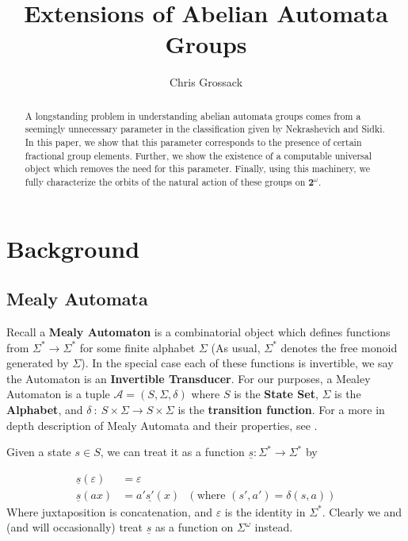 \documentclass[12pt]{article}
\title{Extensions of Abelian Automata Groups}
\author{Chris Grossack}
\newcommand{\A}{\mathcal{A}}
\newcommand{\2}{\textbf{2}}
\begin{document}
\maketitle

\begin{abstract}
  A longstanding problem in understanding abelian automata groups
  comes from a seemingly unnecessary parameter in the classification
  given by Nekrashevich and Sidki. In this paper, we show that
  this parameter corresponds to the presence of certain fractional group
  elements. Further, we show the existence of a computable universal object 
  which removes the need for this parameter. Finally, using this machinery, 
  we fully characterize the orbits of the natural action of these groups on 
  $\2^\omega$.
\end{abstract}

\section{Background}
\subsection{Mealy Automata}
Recall a \textbf{Mealy Automaton} is a combinatorial object which defines
functions from $\Sigma^* \to \Sigma^*$ for some finite alphabet $\Sigma$
(As usual, $\Sigma^*$ denotes the free monoid generated by $\Sigma$).
In the special case each of these functions is invertible, we say the
Automaton is an \textbf{Invertible Transducer}. For our purposes, 
a Mealey Automaton is a tuple 
$\A = (S, \Sigma, \delta)$
where $S$ is the \textbf{State Set}, $\Sigma$ is the \textbf{Alphabet},
and $\delta~:~S \times \Sigma \to S \times \Sigma$ is the
\textbf{transition function}. For a more in depth description of 
Mealy Automata and their properties, 
see \cite{Holcombe, Sakarovitch09:automata_theory}.

Given a state $s \in S$, we can treat it as a function 
$\underline{s} : \Sigma^* \to \Sigma^*$ by 

\begin{align*}
  \underline{s}(\varepsilon) &= \varepsilon\\
  \underline{s}(ax)       &= a' \underline{s'}(x) 
  ~~~(\text{where } (s', a') = \delta(s,a))
\end{align*}
Where juxtaposition is concatenation, and $\varepsilon$ is
the identity in $\Sigma^*$. Clearly we and (and will occasionally) treat 
$\underline{s}$ as a function on $\Sigma^\omega$ instead.
\end{document}
